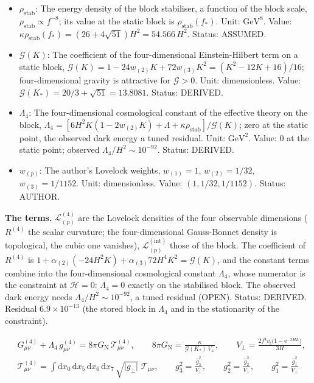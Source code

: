 \documentclass[
  10pt,
]{article}
\begin{document}
\begin{itemize}
  GeV\(^{-2}\). Status: AUTHOR.
\item
  \(\rho_{\mathrm{stab}}\): The energy density of the block stabiliser,
  a function of the block scale,
  \(\rho_{\mathrm{stab}} \propto f^{-8}\); its value at the static block
  is \(\rho_{\mathrm{stab}}(f_*)\). Unit: \(\mathrm{GeV}^{8}\). Value:
  \(\kappa\rho_{\mathrm{stab}}(f_*) = (26 + 4\sqrt{51})H^2 = 54.566\,H^2\).
  Status: ASSUMED.
\item
  \(\mathcal{G}(K)\): The coefficient of the four-dimensional
  Einstein-Hilbert term on a static block,
  \(\mathcal{G}(K) = 1 - 24w_{(2)}K + 72w_{(3)}K^2 = (K^2 - 12K + 16)/16\);
  four-dimensional gravity is attractive for \(\mathcal{G} > 0\). Unit:
  dimensionless. Value:
  \(\mathcal{G}(K_*) = 20/3 + \sqrt{51} = 13.8081\). Status: DERIVED.
\item
  \(\Lambda_4\): The four-dimensional cosmological constant of the
  effective theory on the block,
  \(\Lambda_4 = [6H^2K(1 - 2w_{(2)}K) + \Lambda + \kappa\rho_{\mathrm{stab}}]/\mathcal{G}(K)\);
  zero at the static point, the observed dark energy a tuned residual.
  Unit: \(\mathrm{GeV}^{2}\). Value: 0 at the static point; observed
  \(\Lambda_4/H^2 \sim 10^{-92}\). Status: DERIVED.
\item
  \(w_{(p)}\): The author's Lovelock weights, \(w_{(1)} = 1\),
  \(w_{(2)} = 1/32\), \(w_{(3)} = 1/1152\). Unit: dimensionless. Value:
  \((1, 1/32, 1/1152)\). Status: AUTHOR.
\end{itemize}

\textbf{The terms.} \(\mathcal{L}^{(4)}_{(p)}\) are the Lovelock
densities of the four observable dimensions (\(R^{(4)}\) the scalar
curvature; the four-dimensional Gauss-Bonnet density is topological, the
cubic one vanishes), \(\mathcal{L}^{(\mathrm{int})}_{(p)}\) those of the
block. The coefficient of \(R^{(4)}\) is
\(1 + \alpha_{(2)}(-24H^2K) + \alpha_{(3)}72H^4K^2 = \mathcal{G}(K)\),
and the constant terms combine into the four-dimensional cosmological
constant \(\Lambda_4\), whose numerator is the constraint at
\(\mathcal{H} = 0\): \(\Lambda_4 = 0\) exactly on the stabilised block.
The observed dark energy needs \(\Lambda_4/H^2 \sim 10^{-92}\), a tuned
residual (OPEN). Status: DERIVED. Residual \(6.9\times10^{-13}\) (the
stored block in \(\Lambda_4\) and in the stationarity of the
constraint).

\[
\begin{aligned}
&G^{(4)}_{\mu\nu} + \Lambda_4\,g^{(4)}_{\mu\nu} = 8\pi G_{\mathrm{N}}\,\mathcal{T}^{(4)}_{\mu\nu},\qquad
 8\pi G_{\mathrm{N}} = \frac{\kappa}{\mathcal{G}(K_*)\,V_\perp},\qquad V_\perp =
 \frac{2f^4v_{\mathrm{t}}\big(1 - \mathrm{e}^{-3HL}\big)}{3H},\\
&\mathcal{T}^{(4)}_{\mu\nu} =
 \int\mathrm{d}x_0\,\mathrm{d}x_5\,\mathrm{d}x_6\,\mathrm{d}x_7\,\sqrt{\lvert
 g_\perp\rvert}\;\mathcal{T}_{\mu\nu},
 \qquad g_3^2 = \frac{\hat g_3^2}{V_\perp},\qquad g_2^2 = \frac{\hat g_2^2}{V_\perp},\qquad g_1^2 =
 \frac{\hat g_1^2}{V_\perp}
\end{aligned} \tag{FE-49}
\]
\end{document}
